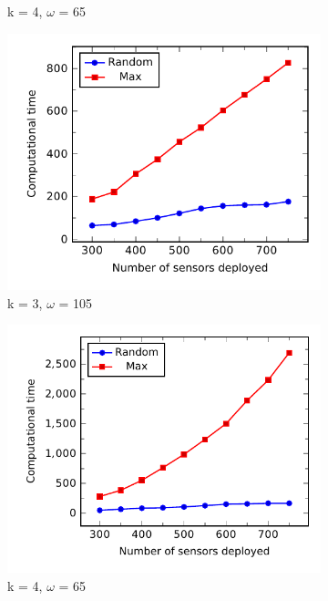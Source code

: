 \begin{figure}[h]
\begin{subfigure}{.5\textwidth}
		\caption{k = 4, $\omega$ = 65}
	\end{subfigure}
\caption{}
\label{fig:}
\end{figure}
%
\begin{figure}[h]
	\begin{subfigure}{.5\textwidth}
		\centering
		\includegraphics[scale=.8]{Hinhanh/SensorNumberEffect/time/k3omega105.pdf}
		\caption{k = 3, $\omega$ = 105}
	\end{subfigure}
	\begin{subfigure}{.5\textwidth}
		\centering
		\includegraphics[scale=.8]{Hinhanh/SensorNumberEffect/time/k4omega65.pdf}
		\caption{k = 4, $\omega$ = 65}
	\end{subfigure}
\caption{}
\label{fig:}
\end{figure}
